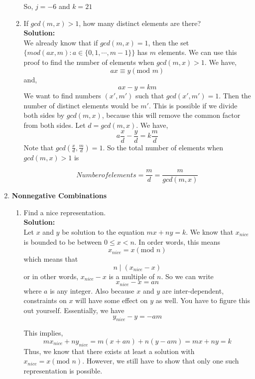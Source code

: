\documentclass[11pt]{article}
\begin{document}
\begin{enumerate}
\begin{enumerate}
				So, $j = -6$ and $k = 21$
				
				\item If $gcd(m,x) > 1$, how many distinct elements are there? \\
				\textbf{Solution: } \\ We already know that if $gcd(m, x) = 1$, then the set $\{ mod(ax, m) : a \in \{0, 1, \cdots , m - 1\}\}$ has $m$ elements. We can use this proof to find the number of elements when $gcd(m, x) > 1$. We have, 
							$$ax \equiv y (\text{mod  } m)$$
				and, 
							$$ax - y = km$$
				We want to find numbers $(x', m')$ such that $gcd(x', m') = 1$. Then the number of distinct elements would be $m'$. This is possible if we divide both sides by $gcd(m, x)$, because this will remove the common factor from both sides. Let $d = gcd(m, x)$. We have,
					$$a \frac{x}{d} - \frac{y}{d} = k \frac{m}{d}  $$
				Note that $gcd(\frac{x}{d}, \frac{m}{d}) = 1$. So the total number of elements when $gcd(m, x) > 1$ is 		
				
				$$Number of elements = \frac{m}{d} = \frac{m}{gcd(m, x)} $$
				
				
				
			\end{enumerate}
		
		
		\item \textbf{Nonnegative Combinations} 
			\begin{enumerate}
				\item Find a nice representation. \\ 
				\textbf{Solution: } \\ Let $x$ and $y$ be solution to the equation $mx + ny = k$. We know that $x_{nice}$ is bounded to be between $0 \le x < n$. In order words, this means 
							$$x_{nice} = x (\text{mod  } n)$$
				which means that $$n \mid (x_{nice} - x)$$ or in other words, $x_{nice} - x$ is a multiple of $n$. So we can write 
							$$x_{nice} - x = an$$ 
				where $a$ is any integer. Also because $x$ and $y$ are inter-dependent, constraints on $x$ will have some effect on $y$ as well. You have to figure this out yourself. Essentially, we have 
							$$y_{nice} - y = -am$$ 
				
				This implies, 
				$$mx_{nice} + ny_{nice} = m(x + an) + n(y - am) = mx + ny = k$$
				Thus, we know that there exists at least a solution with $x_{nice} = x (\text{mod  } n)$. However, we still have to show that only one such representation is possible. 
				

\end{enumerate}
\end{enumerate}
\end{document}
